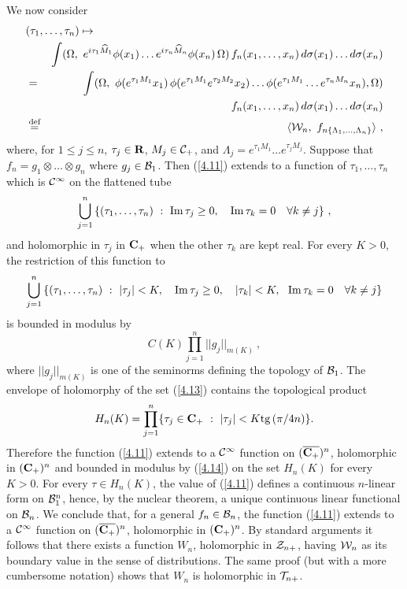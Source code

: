 \documentclass[a4paper,a4paper]{article}
\def\bC{{\bf C}}
\def\bR{{\bf R}}
\def\Im{{\rm Im\,}}
\def\bCp{{\bf C}_+}
\def\tg{{\rm tg\,}}
\def\BB{{\cal B}}
\def\CC{{\cal C}}
\def\TT{{\cal T}}
\def\WW{{\cal W}}
\def\ZZ{{\cal Z}}
\def\wh{\widehat}
\def\ovl{\overline}
\def\bydef{\mathrel{\buildrel \hbox{\scriptsize \rm def} \over =}}
\begin{document}
We now consider
\begin{eqnarray}
\lefteqn{(\tau_1,\ldots,\tau_n) \mapsto} \nonumber\\
&&\int (\Omega,\ e^{i\tau_1 \wh M_1}\phi(x_1) \ldots
e^{i\tau_n \wh M_n}\phi(x_n)\,\Omega)\,f_n(x_1,\ldots,x_n)\,
d\sigma(x_1) \ldots d\sigma(x_n)\nonumber\\
&=& \int
(\Omega,\ \phi(e^{\tau_1 M_1}x_1)\,
\phi(e^{\tau_1 M_1}e^{\tau_2 M_2}x_2) \ldots
\phi(e^{\tau_1 M_1}\ldots e^{\tau_n M_n}x_n) ,\Omega)\nonumber\\
&& \hbox to 4cm{\hfill} f_n(x_1,\ldots,x_n)\,
d\sigma(x_1) \ldots d\sigma(x_n)\nonumber\\
&\bydef& \langle \WW_n,\ f_{n\{\Lambda_1,\ldots , \Lambda_n\}}
\rangle\ ,
\label{4.11}\end{eqnarray}
where, for $1 \le j \le n$, $\tau_j \in \bR$, $M_j \in \CC_+$, and
$\Lambda_j = e^{\tau_1 M_1}\ldots e^{\tau_j M_j}$.
Suppose that $f_n = g_1\otimes \ldots \otimes g_n$ where $g_j \in \BB_1$.
Then (\ref{4.11}) extends to a function of $\tau_1,\ldots,\tau_n$
which is $\CC^\infty$ on the flattened tube
\begin{equation}
\bigcup_{j=1}^n\,
\{(\tau_1,\ldots,\tau_n)\ :\
\Im \tau_j \ge 0,\ \ \ \Im \tau_k = 0\ \ \ \forall k \not= j\}\ ,
\label{4.12}\end{equation}
and holomorphic in $\tau_j$ in $\bC_+$ when the other $\tau_k$ are
kept real.
For every $K > 0$, the restriction of this function to
\begin{equation}
\bigcup_{j=1}^n\,
\{(\tau_1,\ldots,\tau_n)\ :\ |\tau_j| < K,\ \ \
\Im \tau_j \ge 0,\ \ \ |\tau_k| <K,\ \
\Im \tau_k = 0\ \ \ \forall k \not= j\}
\label{4.13}\end{equation}
is bounded in modulus by
\begin{equation}
C(K) \prod_{j=1}^n ||g_j||_{m(K)}\ ,
\label{4.14}\end{equation}
where $||g_j||_{m(K)}$ is one of the seminorms defining the topology
of $\BB_1$. The envelope of holomorphy of the set (\ref {4.13})
contains the topological product
\begin{equation}
H_n(K) = \prod_{j=1}^n \{\tau_j \in \bC_+\ :\ |\tau_j| < K\tg(\pi/4n)\}.
\label{4.15}\end{equation}
Therefore the function (\ref{4.11}) extends to a $\CC^\infty$ function
on $(\ovl{\bCp})^n$, holomorphic in $(\bCp)^n$ and bounded in modulus by
(\ref{4.14}) on the set $H_n(K)$ for every $K > 0$. For every
$\tau \in H_n(K)$, the value of (\ref{4.11}) defines a continuous
$n$-linear form on $\BB_1^n$, hence, by the nuclear theorem, a unique
continuous linear functional on $\BB_n$. We conclude that, for a general
$f_n \in \BB_n$, the function (\ref{4.11}) extends to a $\CC^\infty$ function
on $(\ovl{\bCp})^n$, holomorphic in $(\bCp)^n$. By standard arguments
it follows that there exists a function $W_n$, holomorphic in
$\ZZ_{n+}$, having $\WW_n$ as its boundary value in the sense of
distributions. The same proof (but with a more cumbersome notation)
shows that $W_n$ is holomorphic in $\TT_{n+}$.
\end{document}
